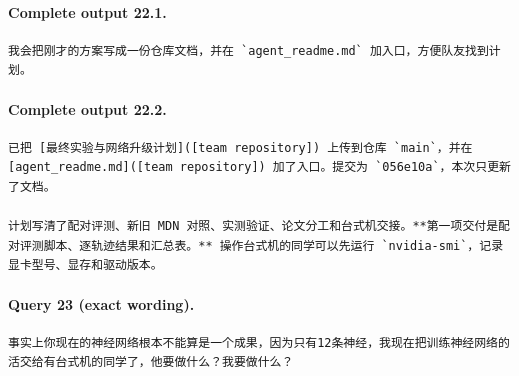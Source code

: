\documentclass[UTF8,10pt]{ctexart}
\begin{document}
\paragraph{Complete output 22.1.}
\begin{Verbatim}[breaklines=true,breakanywhere=true,fontsize=\scriptsize,frame=single,framesep=2pt]
我会把刚才的方案写成一份仓库文档，并在 `agent_readme.md` 加入口，方便队友找到计划。
\end{Verbatim}

\paragraph{Complete output 22.2.}
\begin{Verbatim}[breaklines=true,breakanywhere=true,fontsize=\scriptsize,frame=single,framesep=2pt]
已把 [最终实验与网络升级计划]([team repository]) 上传到仓库 `main`，并在 [agent_readme.md]([team repository]) 加了入口。提交为 `056e10a`，本次只更新了文档。

计划写清了配对评测、新旧 MDN 对照、实测验证、论文分工和台式机交接。**第一项交付是配对评测脚本、逐轨迹结果和汇总表。** 操作台式机的同学可以先运行 `nvidia-smi`，记录显卡型号、显存和驱动版本。
\end{Verbatim}

\paragraph{Query 23 (exact wording).}
\begin{Verbatim}[breaklines=true,breakanywhere=true,fontsize=\scriptsize,frame=single,framesep=2pt]
事实上你现在的神经网络根本不能算是一个成果，因为只有12条神经，我现在把训练神经网络的活交给有台式机的同学了，他要做什么？我要做什么？
\end{Verbatim}
\end{document}
